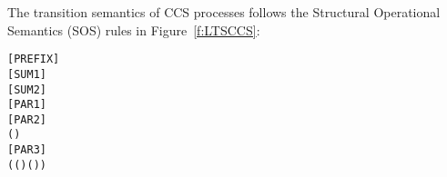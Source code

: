 The transition semantics of CCS processes  follows
the Structural Operational Semantics (SOS) rules in
Figure~\ref{f:LTSCCS}:
\begin{alltt}
\HOLTokenTurnstile{}  \HOLTokenTransBegin{}\HOLTokenTransEnd {}\hfill\texttt{[PREFIX]}
\HOLTokenTurnstile{}  \HOLTokenTransBegin{}\HOLTokenTransEnd {} \HOLSymConst{\HOLTokenImp{}}  \HOLSymConst{+}  \HOLTokenTransBegin{}\HOLTokenTransEnd {}\hfill\texttt{[SUM1]}
\HOLTokenTurnstile{}  \HOLTokenTransBegin{}\HOLTokenTransEnd {} \HOLSymConst{\HOLTokenImp{}}  \HOLSymConst{+}  \HOLTokenTransBegin{}\HOLTokenTransEnd {}\hfill\texttt{[SUM2]}
\HOLTokenTurnstile{}  \HOLTokenTransBegin{}\HOLTokenTransEnd {} \HOLSymConst{\HOLTokenImp{}}  \HOLSymConst{\ensuremath{\parallel}}  \HOLTokenTransBegin{}\HOLTokenTransEnd {} \HOLSymConst{\ensuremath{\parallel}} \hfill\texttt{[PAR1]}
\HOLTokenTurnstile{}  \HOLTokenTransBegin{}\HOLTokenTransEnd {} \HOLSymConst{\HOLTokenImp{}}  \HOLSymConst{\ensuremath{\parallel}}  \HOLTokenTransBegin{}\HOLTokenTransEnd {} \HOLSymConst{\ensuremath{\parallel}} \hfill\texttt{[PAR2]}
\HOLTokenTurnstile{}  \HOLTokenTransBegin{} \HOLTokenTransEnd {} \HOLSymConst{\HOLTokenConj{}}  \HOLTokenTransBegin{} ( )\HOLTokenTransEnd {} \HOLSymConst{\HOLTokenImp{}}
    \HOLSymConst{\ensuremath{\parallel}}  \HOLTokenTransBegin\HOLSymConst{\ensuremath{\tau}}\HOLTokenTransEnd {} \HOLSymConst{\ensuremath{\parallel}} \hfill\texttt{[PAR3]}
\HOLTokenTurnstile{}  \HOLTokenTransBegin{}\HOLTokenTransEnd {} \HOLSymConst{\HOLTokenConj{}} (( \HOLSymConst{=} \HOLSymConst{\ensuremath{\tau}}) \HOLSymConst{\HOLTokenDisj{}} ( \HOLSymConst{=}  ) \HOLSymConst{\HOLTokenConj{}}  \HOLSymConst{\HOLTokenNotIn{}}  \HOLSymConst{\HOLTokenConj{}}   \HOLSymConst{\HOLTokenNotIn{}} ) \HOLSymConst{\HOLTokenImp{}}

\end{alltt}
